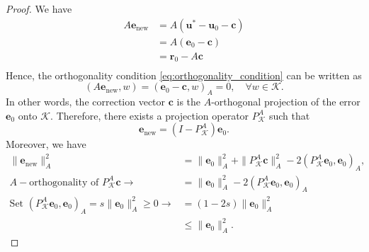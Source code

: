 \begin{proof}
We have
\begin{align*}
    A\mathbf{e}_{\text{new}} & = A(\mathbf{u}^{*} - \mathbf{u}_0 - \mathbf{c}) \\
               & = A(\mathbf{e}_0 - \mathbf{c})       \\
               & = \mathbf{r}_0 - A\mathbf{c} \\
\end{align*}
Hence, the orthogonality condition \cref{eq:orthogonality_condition} can be written as
\[
    (A\mathbf{e}_{\text{new}}, w) = (\mathbf{e}_0 - \mathbf{c}, w)_{A} = 0, \quad \forall w \in \mathcal{K}.
\]
In other words, the correction vector $\mathbf{c}$ is the $A$-orthogonal projection of the error $\mathbf{e}_0$ onto $\mathcal{K}$. Therefore, there exists a projection operator $P_{\mathcal{K}}^{A}$ such that
\[
  \mathbf{e}_{\text{new}} = (I - P_{\mathcal{K}}^{A}) \mathbf{e}_0.
\]
Moreover, we have
\begin{align*}
  \|\mathbf{e}_{\text{new}}\|_A^2 &= \|\mathbf{e}_0\|_A^2  + \|P_{\mathcal{K}}^{A}\mathbf{c}\|_A^2 - 2(P_{\mathcal{K}}^{A}\mathbf{e}_0, \mathbf{e}_0)_A,\\
  A-\text{orthogonality of } P_{\mathcal{K}}^{A}\mathbf{c} \rightarrow &= \|\mathbf{e}_0\|_A^2 - 2(P_{\mathcal{K}}^{A}\mathbf{e}_0, \mathbf{e}_0)_A\\
  \text{Set } (P_{\mathcal{K}}^{A}\mathbf{e}_0, \mathbf{e}_0)_A = s \|\mathbf{e}_0\|_A^2 \geq 0 \rightarrow  &= (1-2s)\|\mathbf{e}_0\|_A^2\\
  &\leq \|\mathbf{e}_0\|_A^2.
\end{align*}
\end{proof}

